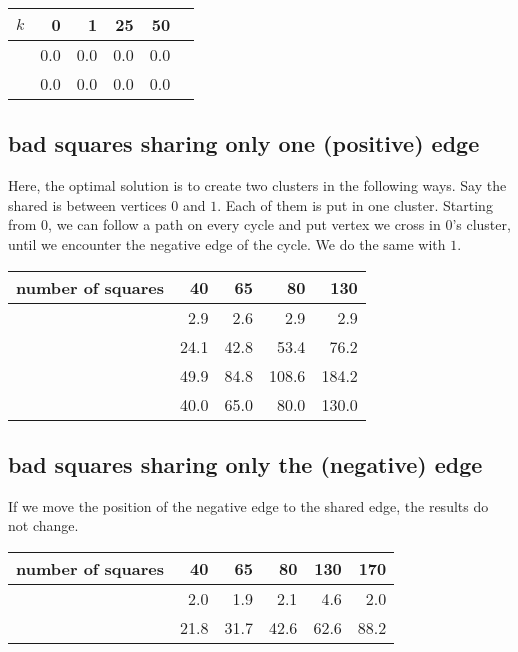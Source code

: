 \begin{center}
\begin{tabular}{lrrrrr}
\toprule
$k$ &   0  &   1  &   25 &   50  \\
\midrule
\pot{} & 0.0 & 0.0 & 0.0 & 0.0  \\
\pat{} &  0.0 &  0.0 & 0.0 & 0.0  \\
\bottomrule
\end{tabular}
\end{center}

\subsection{bad squares sharing only one (positive) edge}
\label{sub:squares}
Here, the optimal solution is to create two clusters in the following ways.
Say the shared is between vertices $0$ and $1$. Each of them is put in one
cluster. Starting from $0$, we can follow a path on every cycle and put
vertex we cross in $0$'s cluster, until we encounter the negative edge of the
cycle. We do the same with $1$.

\begin{center}
\begin{tabular}{lrrrr}
\toprule
number of squares & 40   & 65   & 80    & 130 \\
\midrule
\pot{}            & 2.9  & 2.6  & 2.9   & 2.9 \\
\pat{}            & 24.1 & 42.8 & 53.4  & 76.2 \\
\nnot{}           & 49.9 & 84.8 & 108.6 & 184.2 \\
\nat{}            & 40.0 & 65.0 & 80.0  & 130.0\\
\bottomrule
\end{tabular}
\end{center}


\subsection{bad squares sharing only the (negative) edge}

If we move the position of the negative edge to the shared edge, the results
do not change.

\begin{center}
\begin{tabular}{lrrrrr}
\toprule
number of squares &  40  &  65  &  80  &  130 &  170 \\
\midrule
\pot{} &  2.0 &  1.9 &  2.1 &  4.6 &  2.0 \\
\pat{} & 21.8 & 31.7 & 42.6 & 62.6 & 88.2 \\
\bottomrule
\end{tabular}
\end{center}

